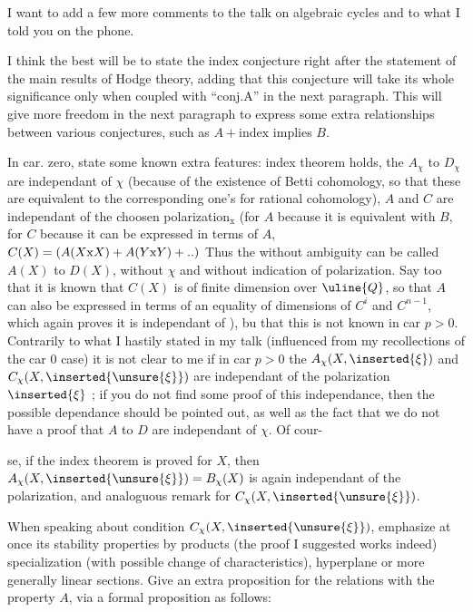I want to add a few more comments to the talk on algebraic cycles and to what I told you on the phone.

I think the best will be to state the index conjecture right after the statement of the main results of Hodge theory, adding that this conjecture will take its whole significance only when coupled with ``conj.A'' in the next paragraph. This will give more freedom in the next paragraph to express some extra relationships between various conjectures, such as $A+\text{index}$ implies $B$.

In car. zero, state some known extra features: index theorem holds, the  $A_{\chi}$ to $D_{\chi}$ are independant of $\chi$ (because of the existence of Betti cohomology, so that these  are equivalent to the corresponding one's for rational cohomology),  $A$ and $C$ are independant of the choosen polarization$_{\mathrm{x}}$ (for $A$ because it is equivalent with $B$, for $C$ because it can be expressed in terms of $A$, $C(X)=(A(X\mathrm{x}X)+A(Y\mathrm{x}Y)+\mathinner{..})$ Thus the  without ambiguity can be called $A(X)$ to $D(X)$, without  $\chi$ and without indication of polarization. Say too that it is known that $C(X)$ is of finite dimension over $\uline{Q}$, \inserted{(}so that $A$ can also be expressed in terms of an equality of dimensions of $C^i$ and $C^{n-1}$\deleted{)}, which again proves it is independant of \hspace{1em}), bu that this is not known in car $p>0$. Contrarily to what I hastily stated in my talk (influenced from my recollections of the car $0$ case) it is not clear to me if in car $p>0$ the   $A_{\chi}(X,\inserted{\xi})$ and $C_{\chi}(X,\inserted{\unsure{\xi}})$ are independant of the polarization $\inserted{\xi}$ ; if you do not find some proof of this independance, then the possible dependance should be pointed out, as well as the fact that  we do not have a proof that $A$ to $D$ are independant of $\chi$. Of cour-

se, if the index theorem is proved for $X$, then $A_{\chi}(X,\inserted{\unsure{\xi}})=B_{\chi}(X)$ is again independant of the polarization, and analoguous remark for $C_{\chi}(X,\inserted{\unsure{\xi}})$.

When speaking about condition $C_{\chi}(X,\inserted{\unsure{\xi}})$, emphasize at once its stability properties by products (the proof I suggested works indeed) specialization (with possible change of characteristics), hyperplane or more generally linear sections. Give an extra proposition for the relations with the property $A$, via a formal proposition as follows:

